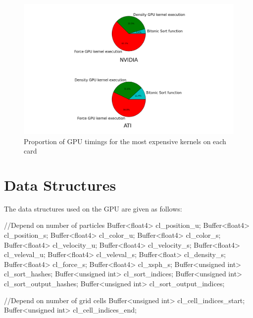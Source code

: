 \begin{figure}[!htbp]
 		\centering
		\includegraphics[width=\columnwidth]{figures/nv_ati_pie.png}
        \caption{ Proportion of GPU timings for the most expensive kernels on each card }
        \label{fig:pies}
\end{figure}

\clearpage
\newpage




\section{Data Structures}
The data structures used on the GPU are given as follows:

\begin{cppcode}{0}
        //Depend on number of particles
        Buffer<float4>      cl_position_u;
        Buffer<float4>      cl_position_s;
        Buffer<float4>      cl_color_u;
        Buffer<float4>      cl_color_s;
        Buffer<float4>      cl_velocity_u;
        Buffer<float4>      cl_velocity_s;
        Buffer<float4>      cl_veleval_u;
        Buffer<float4>      cl_veleval_s;
        Buffer<float>       cl_density_s;
        Buffer<float4>      cl_force_s;
        Buffer<float4>      cl_xsph_s;
        Buffer<unsigned int>         cl_sort_hashes;
        Buffer<unsigned int>         cl_sort_indices;
        Buffer<unsigned int>         cl_sort_output_hashes;
        Buffer<unsigned int>         cl_sort_output_indices;

        //Depend on number of grid cells
        Buffer<unsigned int>         cl_cell_indices_start;
        Buffer<unsigned int>         cl_cell_indices_end;
\end{cppcode}

